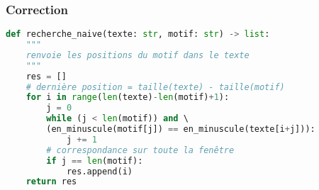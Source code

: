 \documentclass[svgnames,11pt]{beamer}
\begin{document}
\begin{frame}[fragile]
    \frametitle{Correction}

\begin{center}
\begin{lstlisting}[language=Python , basicstyle=\ttfamily\small, xleftmargin=0.2em, xrightmargin=-5em]
def recherche_naive(texte: str, motif: str) -> list:
    """
    renvoie les positions du motif dans le texte
    """
    res = []
    # dernière position = taille(texte) - taille(motif)
    for i in range(len(texte)-len(motif)+1):
        j = 0
        while (j < len(motif)) and \ 
        (en_minuscule(motif[j]) == en_minuscule(texte[i+j])):
            j += 1   
        # correspondance sur toute la fenêtre    
        if j == len(motif):  
            res.append(i)
    return res
\end{lstlisting}
\end{center}

\end{frame}
\end{document}
